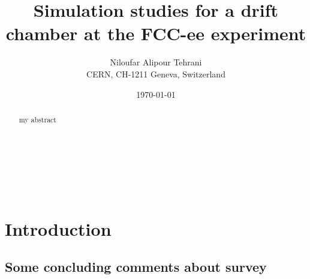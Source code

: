 \documentclass{cernatsnote}
\title{Simulation studies for a drift chamber at the FCC-ee experiment}
\author{
	Niloufar Alipour Tehrani \; \\
	CERN, CH-1211 Geneva, Switzerland
}
\date{\today}
\begin{document}
\maketitle

\begin{abstract}
my abstract
\end{abstract}
\\ \\ \\

\begingroup
\color{black}
\tableofcontents
\endgroup

\pagebreak

\section{Introduction}



\subsection{Some concluding comments about survey}




\end{document}
